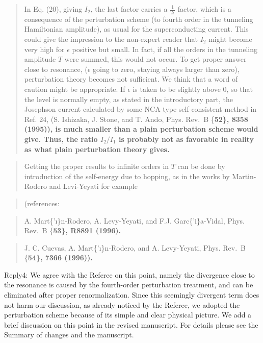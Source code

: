 \documentclass[11pt]{article}
\begin{document}
\begin{quote}
In Eq. (20), giving \(I_2\), the last factor carries a
\(\frac{1}{ 2 \epsilon}\) factor, which is a consequence of the
perturbation scheme (to fourth order in the tunneling Hamiltonian
amplitude), as usual for the superconducting current. This could give
the impression to the non-expert reader that \(I_2\) might become very
high for \(\epsilon\) positive but small. In fact, if all the orders in
the tunneling amplitude \(T\) were summed, this would not occur. To get
proper answer close to resonance, (\(\epsilon\) going to zero, staying
always larger than zero), perturbation theory becomes not sufficient. We
think that a word of caution might be appropriate. If \(\epsilon\) is
taken to be slightly above \(0\), so that the level is normally empty,
as stated in the introductory part, the Josephson current calculated by
some NCA type self-consistent method in Ref. 24, (S. Ishizaka, J. Stone,
and T. Ando, Phys. Rev.~B \{\bf 52\}, 8358 (1995)), is much smaller than
a plain perturbation scheme would give. Thus, the ratio \(I_2/I_1\) is
probably not as favorable in reality as what plain perturbation theory
gives.
\end{quote}

\begin{quote}
Getting the proper results to infinite orders in \(T\) can be done by
introduction of the self-energy due to hopping, as in the works by
Martin-Rodero and Levi-Yeyati for example
\end{quote}

\begin{quote}
(references:
\end{quote}

\begin{quote}
A. Mart\{'\i\}n-Rodero, A. Levy-Yeyati, and F.J. Garc\{'i\}a-Vidal,
Phys. Rev.~B \{\bf 53\}, R8891 (1996).
\end{quote}

\begin{quote}
J. C. Cuevas, A. Mart\{'\i\}n-Rodero, and A. Levy-Yeyati, Phys. Rev.~B
\{\bf 54\}, 7366 (1996)).
\end{quote}

Reply4: We agree with the Referee on this point, namely the divergence
close to the resonance is caused by the fourth-order perturbation
treatment, and can be eliminated after proper renormalization. Since
this seemingly divergent term does not harm our discussion, as already
noticed by the Referee, we adopted the perturbation scheme because of
its simple and clear physical picture. We add a brief discussion on this
point in the revised manuscript. For details please see the Summary of
changes and the manuscript.
\end{document}
